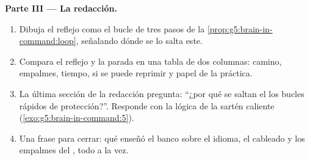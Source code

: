 \begin{problem}
\medskip\noindent\textbf{Parte III --- La redacción.}
\begin{enumerate}[resume]
  \item Dibuja el reflejo como el bucle de tres pasos de la
        \cref{prop:g5:brain-in-command:loop}, señalando dónde se lo
        salta este.
  \item Compara el reflejo y la parada en una tabla de dos columnas:
        camino, empalmes, tiempo, si se puede reprimir y papel de la
        práctica.
  \item La última sección de la redacción pregunta: ``¿por qué se
        saltan el  los bucles rápidos de protección?''. Responde
        con la lógica de la sartén caliente
        (\cref{exo:g5:brain-in-command:5}).
  \item Una frase para cerrar: qué enseñó el banco sobre el idioma, el
        cableado y los empalmes del , todo a la vez.
\end{enumerate}
\end{problem}
